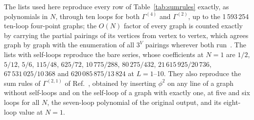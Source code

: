 The lists used here reproduce every row of Table~\ref{tab:sumrules} exactly, as polynomials in $N$, through ten
loops for both $\Gamma^{(4)}$ and $\Gamma^{(2)}$, up to the 1\,593\,254 ten-loop four-point graphs; the $O(N)$ factor of
every graph is counted exactly by carrying the partial pairings of its vertices from vertex to vertex, which agrees
graph by graph with the enumeration of all $3^V$ pairings wherever both run~. The lists with self-loops reproduce the bare series,
whose coefficients at $N=1$ are $1/2$, $5/12$, $5/6$, $115/48$, $625/72$, $10\,775/288$, $80\,275/432$,
$21\,615\,925/20\,736$, $67\,531\,025/10\,368$ and $620\,085\,875/13\,824$ at $L=1$--10. They also reproduce the sum rules of
$\Gamma^{(2,1)}$ of Ref.~\cite{Ribeca2003thesis}, obtained by inserting $\phi^2$ on any line of a graph without
self-loops and on the self-loop of a graph with exactly one, at five and six loops for all $N$, the seven-loop
polynomial of the original output, and its eight-loop value at $N=1$.

